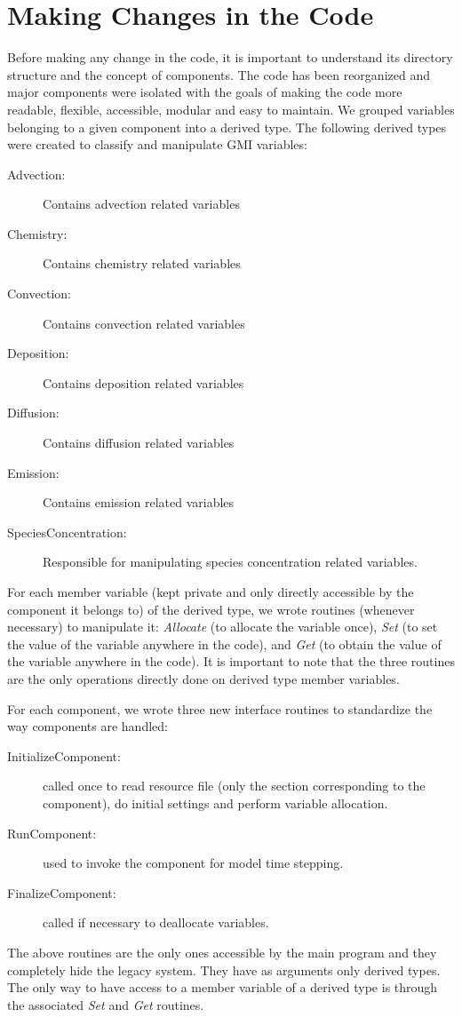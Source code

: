 \section{Making Changes in the Code} \label{sec:changes}
%
Before making any change in the code, it is important to understand
its directory structure and the concept of components.
The code has been reorganized and major components were isolated
with the goals of making the code more readable, flexible,
accessible, modular and easy to maintain.
We grouped variables belonging to a given component into a derived
type.
The following derived types were created to classify and manipulate GMI variables:
%
\begin{description}
\item[Advection:] Contains advection related variables
\item[Chemistry:] Contains chemistry related variables
\item[Convection:] Contains convection related variables
\item[Deposition:] Contains deposition related variables
\item[Diffusion:] Contains diffusion related variables
\item[Emission:] Contains emission related variables
\item[SpeciesConcentration:] Responsible for manipulating species concentration related variables.
\end{description}
%
For each member variable (kept private and only directly accessible by the
component it belongs to) of the derived type, we wrote routines (whenever necessary)
to manipulate it: {\em Allocate} (to allocate the variable once), {\em Set} 
(to set the value of the variable anywhere in the code), and {\em Get} 
(to obtain the value of the variable anywhere in the code).
It is important to note that the three routines are the only operations directly done
on derived type member variables.

For each component, we wrote three new interface routines to standardize the way
components are handled:
%
\begin{description}
\item[InitializeComponent:] called once to read resource file (only the section
     corresponding to the component), do initial settings
     and perform variable allocation.
\item[RunComponent:] used to invoke the component for model time stepping.
\item[FinalizeComponent:] called if necessary to deallocate variables.
\end{description}
%
The above routines are the only ones accessible by the main program and
they completely hide the legacy system.
They have as arguments only derived types.
The only way to have access to a member variable of a derived type is through the
associated {\em Set} and {\em Get} routines.


